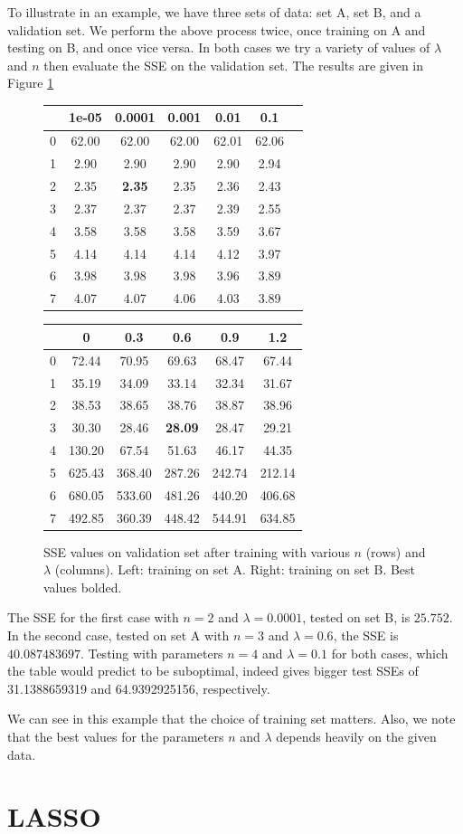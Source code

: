 \documentclass[10pt]{paper}
\begin{document}
To illustrate in an example, we have three sets of data: set A, set B, and a validation set. We perform the above process twice, once training on A and testing on B, and once vice versa. In both cases we try a variety of values of $\lambda$ and $n$ then evaluate the SSE on the validation set. The results are given in Figure \ref{fig:validationtable}
\begin{figure}[ht!]
  \centering
  \label{fig:validationtable}
  \begin{tabular}{c|cccccc}
    & 1e-05 & 0.0001 & 0.001 & 0.01 & 0.1 \\ \hline
  0 & 62.00 & 62.00 & 62.00 & 62.01 & 62.06 \\
  1 & 2.90 & 2.90 & 2.90 & 2.90 & 2.94 \\
  2 & 2.35 & \textbf{2.35} & 2.35 & 2.36 & 2.43 \\
  3 & 2.37 & 2.37 & 2.37 & 2.39 & 2.55 \\
  4 & 3.58 & 3.58 & 3.58 & 3.59 & 3.67 \\
  5 & 4.14 & 4.14 & 4.14 & 4.12 & 3.97 \\
  6 & 3.98 & 3.98 & 3.98 & 3.96 & 3.89 \\
  7 & 4.07 & 4.07 & 4.06 & 4.03 & 3.89 \\
  \end{tabular}
  \qquad
  \begin{tabular}{c|ccccc}
    & 0 & 0.3 & 0.6 & 0.9 & 1.2 \\ \hline
  0 & 72.44 & 70.95 & 69.63 & 68.47 & 67.44 \\
  1 & 35.19 & 34.09 & 33.14 & 32.34 & 31.67 \\
  2 & 38.53 & 38.65 & 38.76 & 38.87 & 38.96 \\
  3 & 30.30 & 28.46 & \textbf{28.09} & 28.47 & 29.21 \\
  4 & 130.20 & 67.54 & 51.63 & 46.17 & 44.35 \\
  5 & 625.43 & 368.40 & 287.26 & 242.74 & 212.14 \\
  6 & 680.05 & 533.60 & 481.26 & 440.20 & 406.68 \\
  7 & 492.85 & 360.39 & 448.42 & 544.91 & 634.85 \\
  \end{tabular}
  \caption{SSE values on validation set after training with various $n$ (rows) and $\lambda$ (columns). Left: training on set A. Right: training on set B. Best values bolded.}
\end{figure}
The SSE for the first case with $n = 2$ and $\lambda = 0.0001$, tested on set B, is $25.752$. In the second case, tested on set A with $n = 3$ and $\lambda = 0.6$, the SSE is $40.087483697$. Testing with parameters $n=4$ and $\lambda = 0.1$ for both cases, which the table would predict to be suboptimal, indeed gives bigger test SSEs of 31.1388659319 and 64.9392925156, respectively.

We can see in this example that the choice of training set matters. Also, we note that the best values for the parameters $n$ and $\lambda$ depends heavily on the given data.


\section{LASSO}
\end{document}

